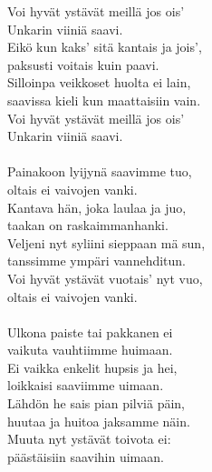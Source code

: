 
            Voi hyvät ystävät meillä jos ois’ \\
            Unkarin viiniä saavi. \\
            Eikö kun kaks’ sitä kantais ja jois’, \\
            paksusti voitais kuin paavi. \\
            Silloinpa veikkoset huolta ei lain, \\
            saavissa kieli kun maattaisiin vain. \\
            Voi hyvät ystävät meillä jos ois’ \\
            Unkarin viiniä saavi. \\
\hspace{10mm} \\
            Painakoon lyijynä saavimme tuo, \\
            oltais ei vaivojen vanki. \\
            Kantava hän, joka laulaa ja juo, \\
            taakan on raskaimmanhanki. \\
            Veljeni nyt syliini sieppaan mä sun, \\
            tanssimme ympäri vannehditun. \\
            Voi hyvät ystävät vuotais’ nyt vuo, \\
            oltais ei vaivojen vanki. \\
\hspace{10mm} \\
            Ulkona paiste tai pakkanen ei \\
            vaikuta vauhtiimme huimaan. \\
            Ei vaikka enkelit hupsis ja hei, \\
            loikkaisi saaviimme uimaan. \\
            Lähdön he sais pian pilviä päin, \\
            huutaa ja huitoa jaksamme näin. \\
            Muuta nyt ystävät toivota ei: \\
            päästäisiin saavihin uimaan. \\
